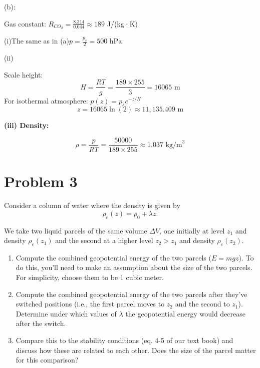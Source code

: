 \documentclass[letterpaper, 11pt]{article}
\newcommand{\1}{\mathds{1}}	%
\theoremstyle{definition}
\begin{document}
(b):

Gas constant: $R_{CO_2} = \frac{8.314}{0.044} \approx 189$ J/(kg·K)

(i)The same as in (a)$p = \frac{p_s}{2} = 500 \text{ hPa}$

(ii) 

Scale height:
\begin{equation*}
H =  \frac{RT}{g} =\frac{189 \times 255}{3} = 16065 \text{ m}
\end{equation*}
For isothermal atmosphere: $p(z) = p_s e^{-z/H}$
\begin{equation*}
z = 16065 \ln(2) \approx 11,135.409 \text{ m}
\end{equation*}

\textbf{(iii) Density:}

\begin{equation*}
\rho = \frac{p}{RT} = \frac{50000}{189 \times 255} \approx 1.037 \text{ kg/m}^3
\end{equation*}

\section*{Problem 3}
Consider a column of water where the density is given by
\begin{equation*}
\rho_e(z) = \rho_0 + \lambda z.
\end{equation*}

We take two liquid parcels of the same volume $\Delta V$, one initially at level $z_1$ and density $\rho_e(z_1)$ and the second at a higher level $z_2 > z_1$ and density $\rho_e(z_2)$.

\begin{enumerate}
    \item[(a)] Compute the combined geopotential energy of the two parcels ($E = mgz$). To do this, you'll need to make an assumption about the size of the two parcels. For simplicity, choose them to be 1 cubic meter.
    
    \item[(b)] Compute the combined geopotential energy of the two parcels after they've switched positions (i.e., the first parcel moves to $z_2$ and the second to $z_1$). Determine under which values of $\lambda$ the geopotential energy would decrease after the switch.
    
    \item[(c)] Compare this to the stability conditions (eq. 4-5 of our text book) and discuss how these are related to each other. Does the size of the parcel matter for this comparison?
\end{enumerate}
\end{document}
